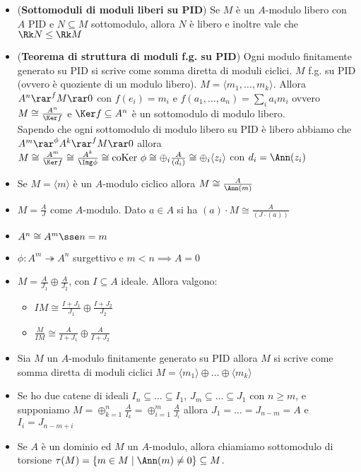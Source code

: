 \documentclass[a4paper,NoNotes,GeneralMath]{stdmdoc}
\newcommand{\srar}{\twoheadrightarrow}
\newcommand{\coKer}{\text{coKer }}
\newcommand{\gen}[1]{\langle {#1} \rangle}
\begin{document}
\begin{itemize}
		\item ({\bf Sottomoduli di moduli liberi su PID}) Se $M$ è un $A$-modulo libero con $A$ PID e $N \subseteq M$ sottomodulo, allora $N$ è libero e inoltre vale che $\Rk N \le \Rk M$
		\item ({\bf Teorema di struttura di moduli f.g. su PID}) Ogni modulo finitamente generato su PID si scrive come somma diretta di moduli ciclici. $M$ f.g. su PID (ovvero è quoziente di un modulo libero). $M = \gen{m_1, \ldots, m_k}$. Allora $A^n \rar^f M \rar 0$ con $f(e_i) = m_i$ e $f(a_1, \ldots, a_n) = \sum_i a_i m_i$ ovvero $M \cong \frac{A^n}{\Ker f}$ e $\Ker f \subseteq A^n$ è un sottomodulo di modulo libero. \\
		Sapendo che ogni sottomodulo di modulo libero su PID è libero abbiamo che $A^m \rar^\phi A^k \rar^f M \rar 0$ allora $M \cong \frac{A^m}{\Ker f} \cong \frac{A^k}{\Img \phi} \cong \coKer \phi \cong \oplus_i \frac{A}{(d_i)} \cong \oplus_i \gen{z_i}$ con $d_i = \Ann(z_i)$
		\item Se $M = \gen{m}$ è un $A$-modulo ciclico allora $M \cong \frac{A}{\Ann(m)}$
		\item $M = \frac{A}{J}$ come $A$-modulo. Dato $a \in A$ si ha $(a) \cdot M \cong \frac{A}{(J \cdot (a))}$
		\item $A^n \cong A^m \sse n = m$
		\item $\phi: A^m \srar A^n$ surgettivo e $m < n \implies A = 0$
		\item $M = \frac{A}{J_1} \oplus \frac{A}{J_2}$, con $I \subseteq A$ ideale. Allora valgono:
			\begin{itemize}
				\item $IM \cong \frac{I + J_1}{J_1} \oplus \frac{I + J_2}{J_2}$
				\item $\frac{M}{IM} \cong \frac{A}{I + J_1} \oplus \frac{A}{I + J_2}$
			\end{itemize}
		\item Sia $M$ un $A$-modulo finitamente generato su PID allora $M$ si scrive come somma diretta di moduli ciclici $M = \gen{m_1} \oplus \ldots \oplus \gen{m_k}$
		\item Se ho due catene di ideali $I_n \subseteq \ldots \subseteq I_1$, $J_m \subseteq \ldots \subseteq J_1$ con $n \ge m$, e supponiamo $M = \oplus_{k=1}^n \frac{A}{I_k} = \oplus_{i=1}^m \frac{A}{J_i}$ allora $J_1 = \ldots = J_{n-m} = A$ e $I_i = J_{n-m+i}$
		\item Se $A$ è un dominio ed $M$ un $A$-modulo, allora chiamiamo sottomodulo di torsione $\tau(M) = \{ m \in M \mid \Ann(m) \neq 0 \} \subseteq M$.

\end{itemize}
\end{document}
